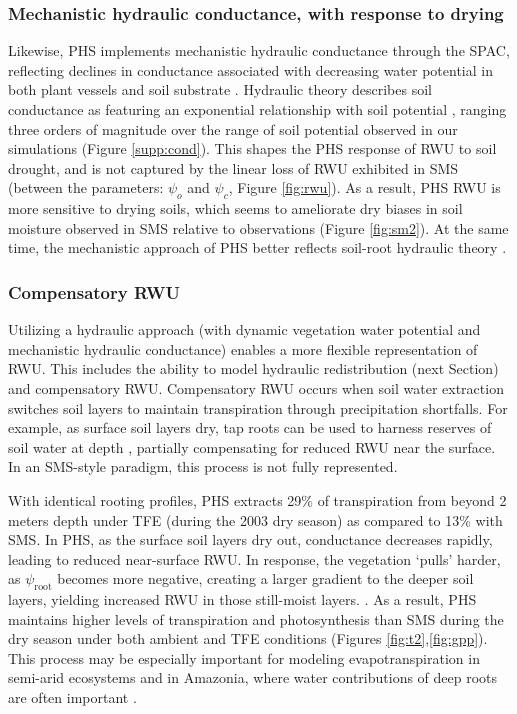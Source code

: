 \documentclass[draft,linenumbers]{agujournal}
\begin{document}
\subsubsection{Mechanistic hydraulic conductance, with response to drying}
Likewise, PHS implements mechanistic hydraulic conductance through the SPAC, reflecting declines in conductance associated with decreasing water potential in both plant vessels and soil substrate \citep{tyree1989}.
Hydraulic theory describes soil conductance as featuring an exponential relationship with soil potential \citep{brooks1964}, ranging three orders of magnitude over the range of soil potential observed in our simulations (Figure \ref{supp:cond}).
This shapes the PHS response of RWU to soil drought, and is not captured by the linear loss of RWU exhibited in SMS (between the parameters: $\psi_o$ and $\psi_c$, Figure \ref{fig:rwu}).
As a result, PHS RWU is more sensitive to drying soils, which seems to ameliorate dry biases in soil moisture observed in SMS relative to observations (Figure \ref{fig:sm2}).
At the same time, the mechanistic approach of PHS better reflects soil-root hydraulic theory \citep{cai2018,warren2015}.

\subsubsection{Compensatory RWU}
Utilizing a hydraulic approach (with dynamic vegetation water potential and mechanistic hydraulic conductance) enables a more flexible representation of RWU.
This includes the ability to model hydraulic redistribution (next Section) and compensatory RWU.
Compensatory RWU occurs when soil water extraction switches soil layers to maintain transpiration through precipitation shortfalls.
For example, as surface soil layers dry, tap roots can be used to harness reserves of soil water at depth \citep{oliveira2005}, partially compensating for reduced RWU near the surface.
In an SMS-style paradigm, this process is not fully represented.

With identical rooting profiles, PHS extracts 29\% of transpiration from beyond 2 meters depth under TFE (during the 2003 dry season) as compared to 13\% with SMS.
In PHS, as the surface soil layers dry out, conductance decreases rapidly, leading to reduced near-surface RWU.
In response, the vegetation `pulls' harder, as $\psi_{\text{root}}$ becomes more negative, creating a larger gradient to the deeper soil layers, yielding increased RWU in those still-moist layers.
.
As a result, PHS maintains higher levels of transpiration and photosynthesis than SMS during the dry season under both ambient and TFE conditions (Figures \ref{fig:t2},\ref{fig:gpp}).
This process may be especially important for modeling evapotranspiration in semi-arid ecosystems \citep{jarvis2011} and in Amazonia, where water contributions of deep roots are often important \citep{nepstad1994}.
\end{document}
